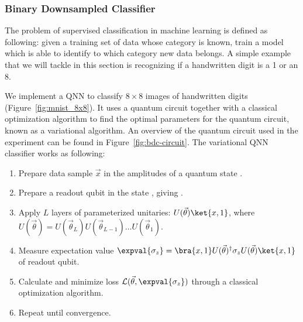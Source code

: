 \documentclass[a4paper,10pt]{article}
\begin{document}
\subsubsection{Binary Downsampled Classifier} \label{sec:bdc}
The problem of supervised classification in machine learning is defined as following: given a training set of data whose category is known, train a model which is able to identify to which category new data belongs.
A simple example that we will tackle in this section is recognizing if a handwritten digit is a 1 or an 8.

We implement a QNN to classify $8 \times 8$ images of handwritten digits (Figure~\ref{fig:mnist_8x8}).
It uses a quantum circuit together with a classical optimization algorithm to find the optimal parameters for the quantum circuit, known as a variational algorithm.
An overview of the quantum circuit used in the experiment can be found in Figure~\ref{fig:bdc-circuit}.
The variational QNN classifier works as following:
\begin{enumerate}
	\item Prepare data sample $\vec{x}$ in the amplitudes of a quantum state .
	\item Prepare a readout qubit in the state , giving .
	\item Apply $L$ layers of parameterized unitaries: $U(\vec{\theta})\ket{x, 1}$, where $U(\vec{\theta}) = U(\vec{\theta}_L) U(\vec{\theta}_{L-1}) \ldots U(\vec{\theta}_1)$.
	\item Measure expectation value $\expval{\sigma_z} = \bra{x, 1}U(\vec{\theta})^\dagger \sigma_z U(\vec{\theta})\ket{x, 1}$ of readout qubit.
	\item Calculate and minimize loss $\mathcal{L}(\vec{\theta}, \expval{\sigma_z})$ through a classical optimization algorithm.
	\item Repeat until convergence.
\end{enumerate}
\end{document}
